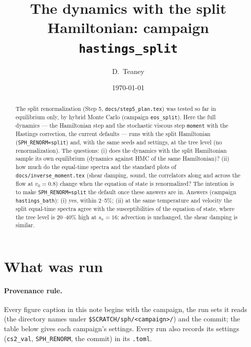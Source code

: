 \documentclass[11pt,aps,preprint,nofootinbib,superscriptaddress,tightenlines]{revtex4-2}
\let\oldparagraph\paragraph
\renewcommand{\paragraph}{\par\bigskip\oldparagraph}
\begin{document}
\sloppy

\title{The dynamics with the split Hamiltonian: campaign \texttt{hastings\_split}}
\author{D.~Teaney}
\date{\today}

\begin{abstract}
The split renormalization (Step 5, \texttt{docs/step5\_plan.tex}) was tested so far in equilibrium only, by hybrid Monte Carlo
(campaign \texttt{eos\_split}).  Here the full dynamics --- the Hamiltonian step and the stochastic viscous step \texttt{moment} with the
Hastings correction, the current defaults --- runs with the split Hamiltonian (\texttt{SPH\_RENORM=split}) and, with the same seeds and
settings, at the tree level (no renormalization).  The questions: (i) does the dynamics with the split Hamiltonian sample its own
equilibrium (dynamics against HMC of the same Hamiltonian)? (ii) how much do the equal-time spectra and the standard plots of
\texttt{docs/inverse\_moment.tex} (shear damping, sound, the correlators along and across the flow at $v_0=0.8$) change when the
equation of state is renormalized?  The intention is to make \texttt{SPH\_RENORM=split} the default once these answers are in.  Answers (campaign \texttt{hastings\_bath}):
(i) yes, within 2--5\%; (ii) at the same temperature and velocity the split equal-time spectra agree with the susceptibilities of the
equation of state, where the tree level is 20--40\% high at $s_a=16$; advection is unchanged, the shear damping is similar.
\end{abstract}

\maketitle

\section{What was run}
\label{sec:runs}

\paragraph{Provenance rule.}  Every figure caption in this note begins with the campaign, the run sets it reads (the directory names
under \texttt{\$SCRATCH/sph/<campaign>/}) and the commit; the table below gives each campaign's settings.  Every run also records its
settings (\texttt{cs2\_val}, \texttt{SPH\_RENORM}, the commit) in its \texttt{.toml}.
\end{document}
